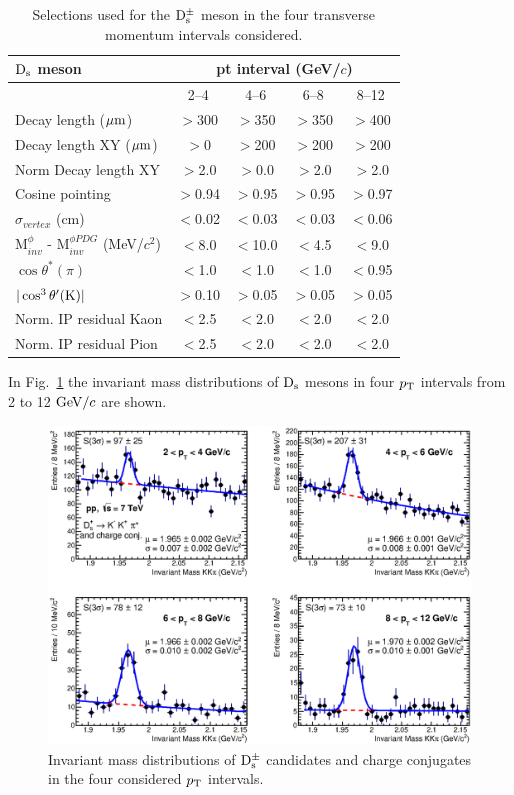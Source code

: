 \begin{table}[tbh!]
\centering
\begin{tabular}{|l|c|c|c|c|} 
\hline 
 ${\rm D_s}$ meson& \multicolumn{4}{c|}{pt interval (GeV/$c$)}\\
\hline
 & 2--4  & 4--6 & 6--8 & 8--12\\
\hline
Decay length ($\mathrm{\mu m}$)        & $>$300 & $>$350 & $>$350 & $>$400\\
Decay length XY ($\mathrm{\mu m}$)     & $>$0 & $>$200 & $>$200 & $>$200\\
Norm Decay length XY          & $>$2.0& $>$0.0 & $>$2.0 & $>$2.0\\
Cosine pointing              & $>$0.94 & $>$0.95 & $>$0.95 & $>$0.97\\
$\sigma_{vertex}$  (cm)          & $<$0.02 & $<$0.03 & $<$0.03 & $<$0.06\\
M$^{\phi}_{inv}$ - M$^{\phi PDG}_{inv}$ (MeV/$c^{2}$) & $<$8.0 & $<$10.0 & $<$4.5 & $<$9.0\\
$\cos \theta^*(\pi)$    & $<$1.0 & $<$1.0 & $<$1.0 & $<$0.95\\
$|\cos^3 \theta^\prime({\rm K})|$        & $>$0.10 & $>$0.05 & $>$0.05 & $>$0.05\\
Norm. IP residual Kaon  & $<$2.5 & $<$2.0 & $<$2.0 & $<$2.0 \\
Norm. IP residual Pion  & $<$2.5 & $<$2.0 & $<$2.0 & $<$2.0 \\[1ex]
\hline
\end{tabular}
\caption{Selections used for the ${\rm D_s^{\pm}}$ meson in the four transverse momentum intervals considered.} 
\label{tab:cutsDs}
\end{table}
In Fig.~\ref{fig:invmassDs} the invariant mass distributions 
of ${\rm D_s}$ mesons in four $p_{\rm T}$ intervals from 2 to 12 $\mathrm{GeV}/c$ are shown.
\begin{figure}[!htb]
\begin{center}
 \includegraphics[width=.99\textwidth]{FigCap4/DsMassHistos_ppPass4.eps}
\caption{Invariant mass distributions of ${\rm D_s^{\pm}}$ candidates and charge
conjugates in the four considered $p_{\rm T}$ intervals.}             
\label{fig:invmassDs}
\end{center}
\end{figure}
